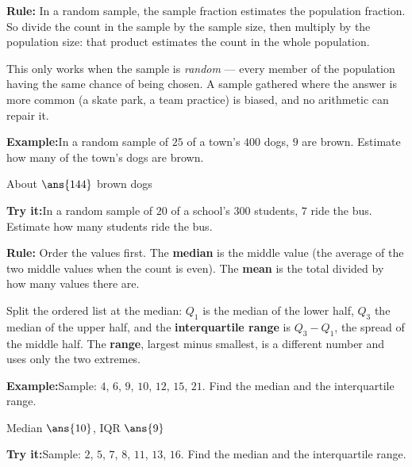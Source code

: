 \documentclass[12pt]{article}
\begin{document}
\begin{formulabox}
\textbf{Rule:} In a random sample, the sample fraction estimates the population
fraction. So divide the count in the sample by the sample size, then multiply
by the population size: that product estimates the count in the whole
population.\par
This only works when the sample is \emph{random} --- every member of the
population having the same chance of being chosen. A sample gathered where the
answer is more common (a skate park, a team practice) is biased, and no
arithmetic can repair it.
\end{formulabox}
\begin{examplebox}
\textbf{Example:}\quad In a random sample of $25$ of a town's $400$ dogs, $9$
are brown. Estimate how many of the town's dogs are brown.

About $\ans{144}$ brown dogs
\end{examplebox}
\begin{tryitbox}
\textbf{Try it:}\quad In a random sample of $20$ of a school's $300$ students,
$7$ ride the bus. Estimate how many students ride the bus.\\[2pt]
\end{tryitbox}

\begin{formulabox}
\textbf{Rule:} Order the values first. The \textbf{median} is the middle value
(the average of the two middle values when the count is even). The
\textbf{mean} is the total divided by how many values there are.\par
Split the ordered list at the median: $Q_1$ is the median of the lower half,
$Q_3$ the median of the upper half, and the \textbf{interquartile range} is
$Q_3 - Q_1$, the spread of the middle half. The \textbf{range}, largest minus
smallest, is a different number and uses only the two extremes.
\end{formulabox}
\begin{examplebox}
\textbf{Example:}\quad Sample: $4$, $6$, $9$, $10$, $12$, $15$, $21$. Find the
median and the interquartile range.

Median $\ans{10}$, IQR $\ans{9}$
\end{examplebox}
\begin{tryitbox}
\textbf{Try it:}\quad Sample: $2$, $5$, $7$, $8$, $11$, $13$, $16$. Find the
median and the interquartile range.\\[2pt]
\end{tryitbox}
\end{document}
